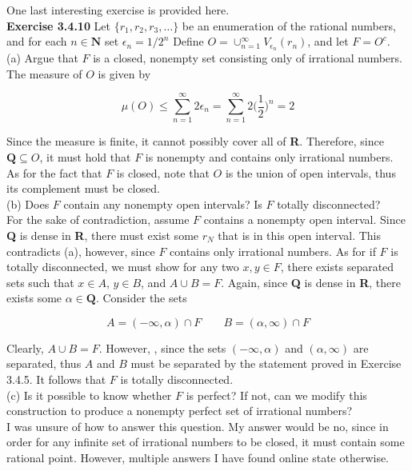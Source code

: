 \documentclass[12pt, letterpaper, twoside]{article}
\newcommand{\N}{\textbf{N}}
\newcommand{\R}{\textbf{R}}
\newcommand{\Q}{\textbf{Q}}
\begin{document}
One last interesting exercise is provided here. \\

\textbf{Exercise 3.4.10} Let $\{r_1, r_2, r_3, \dots \}$ be an enumeration of the rational numbers,
and for each $n \in \N$ set $\epsilon_n = 1/2^n$ Define $O = \cup_{n=1}^\infty V_{\epsilon_n} (r_n)$, and let $F = O^c$. \\

(a) Argue that $F$ is a closed, nonempty set consisting only of irrational
numbers. \\

The measure of $O$ is given by 

$$
\mu(O) \leq \sum_{n=1}^\infty 2\epsilon_n = \sum_{n=1}^\infty 2 \bigg(\frac{1}{2}\bigg)^n = 2
$$

Since the measure is finite, it cannot possibly cover all of \R. Therefore, since $\Q \subseteq O$, it must hold that $F$ is nonempty and contains only irrational numbers. As for the fact that $F$ is closed, note that $O$ is the union of open intervals, thus its complement must be closed. \\

(b) Does $F$ contain any nonempty open intervals? Is $F$ totally disconnected? \\

For the sake of contradiction, assume $F$ contains a nonempty open interval. Since \textbf{Q} is dense in \R, there must exist some $r_N$ that is in this open interval. This contradicts (a), however, since $F$ contains only irrational numbers. As for if $F$ is totally disconnected, we must show for any two $x, y \in F$, there exists separated sets such that $x \in A$, $y \in B$, and $A \cup B = F$. Again, since \textbf{Q} is dense in \R, there exists some $\alpha \in \Q$. Consider the sets

$$
A = (-\infty, \alpha) \cap F \qquad        B = (\alpha, \infty) \cap F
$$

Clearly, $A \cup B = F$. However, , since the sets $(-\infty, \alpha)$ and $(\alpha, \infty)$ are separated, thus $A$ and $B$ must be separated by the statement proved in Exercise 3.4.5. It follows that $F$ is totally disconnected. \\

(c) Is it possible to know whether $F$ is perfect? If not, can we modify this
construction to produce a nonempty perfect set of irrational numbers? \\

I was unsure of how to answer this question. My answer would be no, since in order for any infinite set of irrational numbers to be closed, it must contain some rational point. However, multiple answers I have found online state otherwise. 
\end{document}
